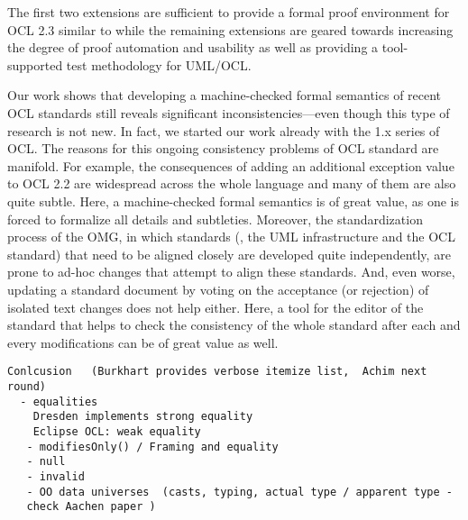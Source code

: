 The first two extensions are sufficient to provide a formal proof
environment for OCL 2.3 similar to \holocl while the remaining
extensions are geared towards increasing the degree of proof
automation and usability as well as providing a tool-supported test
methodology for {UML}/{OCL}.


Our work shows that developing a machine-checked formal semantics of
recent {OCL} standards still reveals significant
inconsistencies---even though this type of research is not new. In
fact, we started our work already with the 1.x series of
{OCL}. The reasons for this ongoing consistency problems of
{OCL} standard are manifold. For example, the consequences of
adding an additional exception value to OCL 2.2 are widespread across
the whole language and many of them are also quite subtle. Here, a
machine-checked formal semantics is of great value, as one is forced
to formalize all details and subtleties.  Moreover, the
standardization process of the {OMG}, in which standards (\eg, the
{UML} infrastructure and the {OCL} standard) that need to be
aligned closely are developed quite independently, are prone to ad-hoc
changes that attempt to align these standards. And, even worse,
updating a standard document by voting on the acceptance (or
rejection) of isolated text changes does not help either. Here, a tool
for the editor of the standard that helps to check the consistency of
the whole standard after each and every modifications can be of great
value as well.


\begin{verbatim}
Conlcusion   (Burkhart provides verbose itemize list,  Achim next round)
  - equalities
    Dresden implements strong equality
    Eclipse OCL: weak equality        
   - modifiesOnly() / Framing and equality
   - null
   - invalid
   - OO data universes  (casts, typing, actual type / apparent type -
   check Aachen paper )
\end{verbatim}


